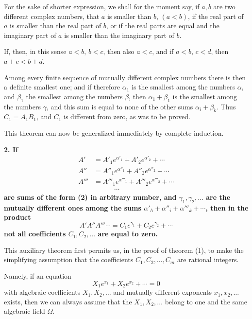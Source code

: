 \documentclass[11pt]{article}
\begin{document}
For the sake of shorter expression, we shall for the moment say, if $a,b$ are two different complex numbers, that $a$ is smaller than $b$, $(a<b)$, if the real part of $a$ is smaller than the real part of $b$, or if the real parts are equal and the imaginary part of $a$ is smaller than the imaginary part of $b$.

If, then, in this sense $a<b$, $b<c$, then also $a<c$, and if $a<b$, $c<d$, then $a+c<b+d$.

Among every finite sequence of mutually different complex numbers there is then a definite smallest one; and if therefore $\alpha_1$ is the smallest among the numbers $\alpha$, and $\beta_1$ the smallest among the numbers $\beta$, then $\alpha_1+\beta_1$ is the smallest among the numbers $\gamma$, and this sum is equal to none of the other sums $\alpha_i+\beta_k$. Thus $C_1=A_1B_1$, and $C_1$ is different from zero, as was to be proved.

This theorem can now be generalized immediately by complete induction.

\textbf{2. If}
\[
\begin{aligned}
A'&=A'_1e^{\alpha'_1}+A'_2e^{\alpha'_2}+\cdots\\
A''&=A''_1e^{\alpha''_1}+A''_2e^{\alpha''_2}+\cdots\\
A'''&=A'''_1e^{\alpha'''_1}+A'''_2e^{\alpha'''_2}+\cdots\\
&\hspace{3em}\cdots
\end{aligned}
\]
\textbf{are sums of the form (2) in arbitrary number, and $\gamma_1,\gamma_2,\ldots$ are the mutually different ones among the sums $\alpha'_h+\alpha''_i+\alpha'''_k+\cdots$, then in the product}
\begin{equation}\tag{4}
A'A''A'''\cdots=C_1e^{\gamma_1}+C_2e^{\gamma_2}+\cdots
\end{equation}
\textbf{not all coefficients $C_1,C_2,\ldots$ are equal to zero.}

This auxiliary theorem first permits us, in the proof of theorem (1), to make the simplifying assumption that the coefficients $C_1,C_2,\ldots,C_m$ are rational integers.

Namely, if an equation
\begin{equation}\tag{5}
X_1e^{x_1}+X_2e^{x_2}+\cdots=0
\end{equation}
with algebraic coefficients $X_1,X_2,\ldots$ and mutually different exponents $x_1,x_2,\ldots$ exists, then we can always assume that the $X_1,X_2,\ldots$ belong to one and the same algebraic field $\Omega$.
\end{document}
